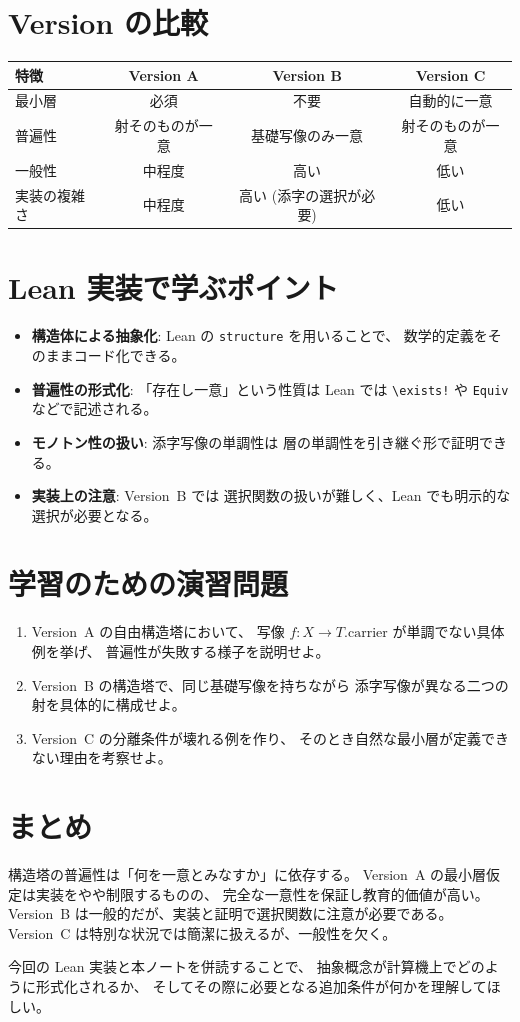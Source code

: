 \documentclass[luatex,a4paper]{ltjsarticle}
\theoremstyle{definition}
\theoremstyle{plain}
\theoremstyle{remark}
\begin{document}
\section{Version の比較}
\begin{center}
\setlength{\tabcolsep}{6pt}
\begin{tabular}{lccc}
\hline
特徴 & Version A & Version B & Version C \\
\hline
最小層 & 必須 & 不要 & 自動的に一意 \\
普遍性 & 射そのものが一意 & 基礎写像のみ一意 & 射そのものが一意 \\
一般性 & 中程度 & 高い & 低い \\
実装の複雑さ & 中程度 & 高い (添字の選択が必要) & 低い \\
\hline
\end{tabular}
\end{center}

\section{Lean 実装で学ぶポイント}
\begin{itemize}
  \item \textbf{構造体による抽象化}: Lean の \texttt{structure} を用いることで、
    数学的定義をそのままコード化できる。
  \item \textbf{普遍性の形式化}: 「存在し一意」という性質は
    Lean では \texttt{\textbackslash exists!} や
    \texttt{Equiv} などで記述される。
  \item \textbf{モノトン性の扱い}: 添字写像の単調性は
    層の単調性を引き継ぐ形で証明できる。
  \item \textbf{実装上の注意}: Version~B では
    選択関数の扱いが難しく、Lean でも明示的な選択が必要となる。
\end{itemize}

\section{学習のための演習問題}
\begin{enumerate}[label=\textbf{演習 \arabic*.}]
  \item Version~A の自由構造塔において、
    写像 $f : X \to T.\mathrm{carrier}$ が単調でない具体例を挙げ、
    普遍性が失敗する様子を説明せよ。
  \item Version~B の構造塔で、同じ基礎写像を持ちながら
    添字写像が異なる二つの射を具体的に構成せよ。
  \item Version~C の分離条件が壊れる例を作り、
    そのとき自然な最小層が定義できない理由を考察せよ。
\end{enumerate}

\section{まとめ}
構造塔の普遍性は「何を一意とみなすか」に依存する。
Version~A の最小層仮定は実装をやや制限するものの、
完全な一意性を保証し教育的価値が高い。
Version~B は一般的だが、実装と証明で選択関数に注意が必要である。
Version~C は特別な状況では簡潔に扱えるが、一般性を欠く。

今回の Lean 実装と本ノートを併読することで、
抽象概念が計算機上でどのように形式化されるか、
そしてその際に必要となる追加条件が何かを理解してほしい。
\end{document}
